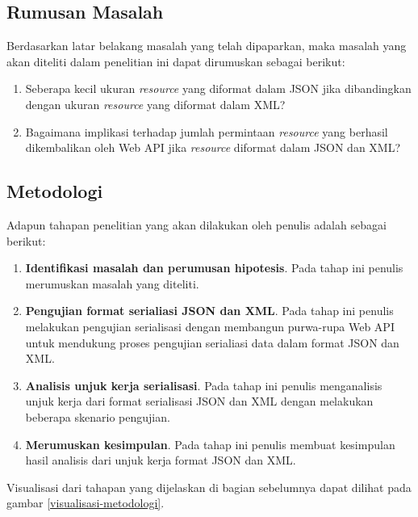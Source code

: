 \documentclass{llncs}
\begin{document}
\subsection{Rumusan Masalah}
\onehalfspacing Berdasarkan latar belakang masalah yang telah dipaparkan, maka masalah yang akan diteliti dalam penelitian ini dapat dirumuskan sebagai berikut:
\begin{enumerate}
  \item Seberapa kecil ukuran \textit{resource} yang diformat dalam JSON jika dibandingkan dengan ukuran \textit{resource} yang diformat dalam XML? 
  \item Bagaimana implikasi terhadap jumlah permintaan  \textit{resource} yang berhasil dikembalikan oleh Web API jika \textit{resource} diformat dalam JSON dan XML?
\end{enumerate}

\subsection{Metodologi}
\onehalfspacing Adapun tahapan penelitian yang akan dilakukan oleh penulis adalah sebagai berikut:
\begin{enumerate}
  \item \textbf{Identifikasi masalah dan perumusan hipotesis}. Pada tahap ini penulis merumuskan masalah yang diteliti.
  \item \textbf{Pengujian format serialiasi JSON dan XML}. Pada tahap ini penulis melakukan pengujian serialisasi dengan membangun purwa-rupa Web API untuk mendukung proses pengujian serialiasi data dalam format JSON dan XML.
  \item \textbf{Analisis unjuk kerja serialisasi}. Pada tahap ini penulis menganalisis unjuk kerja dari format serialisasi JSON dan XML dengan melakukan beberapa skenario pengujian.
  \item \textbf{Merumuskan kesimpulan}. Pada tahap ini penulis membuat kesimpulan hasil analisis dari unjuk kerja format JSON dan XML.
\end{enumerate}

Visualisasi dari tahapan yang dijelaskan di bagian sebelumnya dapat dilihat pada gambar \ref{visualisasi-metodologi}.
\end{document}
